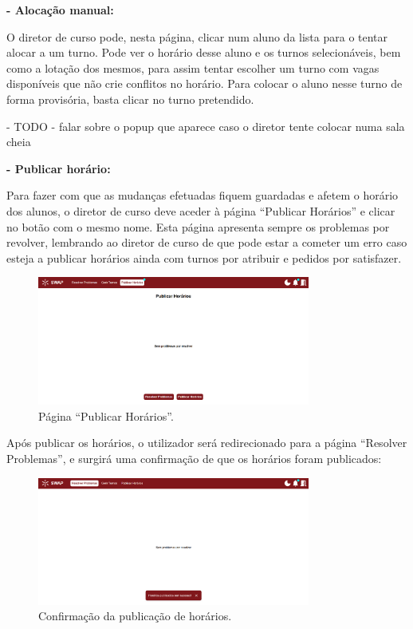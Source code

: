 \documentclass[12pt, a4paper]{article}
\begin{document}
\textbf{- Alocação manual:}

O diretor de curso pode, nesta página, clicar num aluno da lista para o tentar alocar a um turno.
Pode ver o horário desse aluno e os turnos selecionáveis, bem como a lotação dos mesmos, para assim
tentar escolher um turno com vagas disponíveis que não crie conflitos no horário. Para colocar o
aluno nesse turno de forma provisória, basta clicar no turno pretendido.

{\color{red} - TODO - falar sobre o popup que aparece caso o diretor tente colocar numa sala cheia}

\textbf{- Publicar horário:}

Para fazer com que as mudanças efetuadas fiquem guardadas e afetem o horário dos alunos, o diretor
de curso deve aceder à página ``Publicar Horários'' e clicar no botão com o mesmo nome. Esta página
apresenta sempre os problemas por revolver, lembrando ao diretor de curso de que pode estar a
cometer um erro caso esteja a publicar horários ainda com turnos por atribuir e pedidos por
satisfazer.

\begin{figure}[H]
    \centering
    \includegraphics[width=0.8\textwidth]{res/manual/publicar_horario.png}
    \caption{Página ``Publicar Horários''.}
    \label{publicar_horarios}
\end{figure}

Após publicar os horários, o utilizador será redirecionado para a página ``Resolver Problemas'', e
surgirá uma confirmação de que os horários foram publicados:

\begin{figure}[H]
    \centering
    \includegraphics[width=0.8\textwidth]{res/manual/toast_horario_publicado.png}
    \caption{Confirmação da publicação de horários.}
    \label{toast_horario_publicado}
\end{figure}
\end{document}
